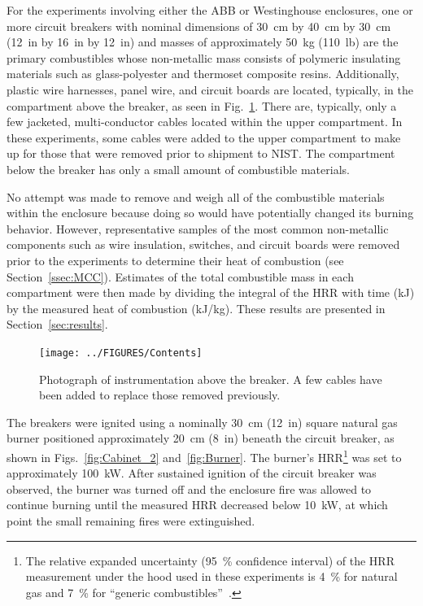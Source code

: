 For the experiments involving either the ABB or Westinghouse enclosures, one or more circuit breakers with nominal dimensions of 30~cm by 40~cm by 30~cm (12~in by 16~in by 12~in) and masses of approximately 50~kg (110~lb) are the primary combustibles whose non-metallic mass consists of polymeric insulating materials such as glass-polyester and thermoset composite resins. Additionally, plastic wire harnesses, panel wire, and circuit boards are located, typically, in the compartment above the breaker, as seen in Fig.~\ref{fig:Contents}. There are, typically, only a few jacketed, multi-conductor cables located within the upper compartment. In these experiments, some cables were added to the upper compartment to make up for those that were removed prior to shipment to NIST. The compartment below the breaker has only a small amount of combustible materials.

No attempt was made to remove and weigh all of the combustible materials within the enclosure because doing so would have potentially changed its burning behavior. However, representative samples of the most common non-metallic components such as wire insulation, switches, and circuit boards were removed prior to the experiments to determine their heat of combustion (see Section~\ref{ssec:MCC}). Estimates of the total combustible mass in each compartment were then made by dividing the integral of the HRR with time (kJ) by the measured heat of combustion (kJ/kg). These results are presented in Section~\ref{sec:results}.

\begin{figure}[t]
\centering
\texttt{[image: ../FIGURES/Contents]}
\caption[Photograph of instrumentation above the breaker] {Photograph of instrumentation above the breaker. A few cables have been added to replace those removed previously.}
\label{fig:Contents}
\end{figure}

The breakers were ignited using a nominally 30~cm (12~in) square natural gas burner positioned approximately 20~cm (8~in) beneath the circuit breaker, as shown in Figs.~\ref{fig:Cabinet_2} and~\ref{fig:Burner}. The burner's HRR\footnote{The relative expanded uncertainty (95~\% confidence interval) of the HRR measurement under the hood used in these experiments is 4~\% for natural gas and 7~\% for ``generic combustibles''~\cite{bryant2019nist}.} was set to approximately 100~kW. After sustained ignition of the circuit breaker was observed, the burner was turned off and the enclosure fire was allowed to continue burning until the measured HRR decreased below 10~kW, at which point the small remaining fires were extinguished.


